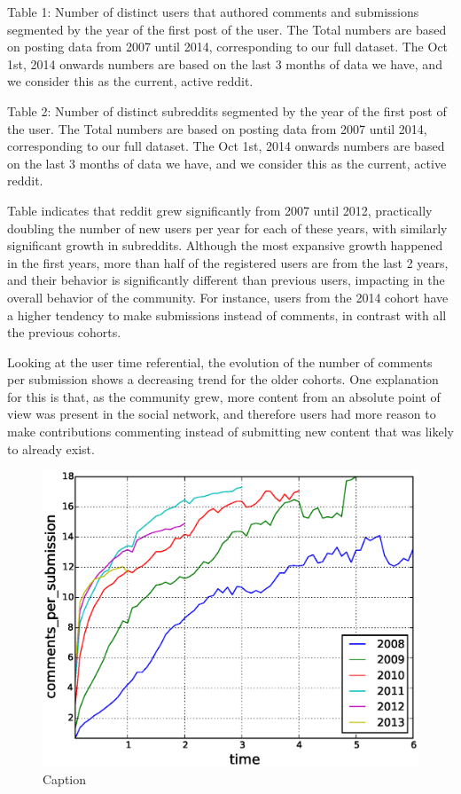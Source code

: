 Table 1: Number of distinct users that authored comments and submissions segmented by the year of the first post of the user. The Total numbers are based on posting data from 2007 until 2014, corresponding to our full dataset. The Oct 1st, 2014 onwards numbers are based on the last 3 months of data we have, and we consider this as the current, active reddit.


Table 2: Number of distinct subreddits segmented by the year of the first post of the user. The Total numbers are based on posting data from 2007 until 2014, corresponding to our full dataset. The Oct 1st, 2014 onwards numbers are based on the last 3 months of data we have, and we consider this as the current, active reddit.

Table indicates that reddit grew significantly from 2007 until 2012, practically doubling the number of new users per year for each of these years, with similarly significant growth in subreddits. Although the most expansive growth happened in the first years, more than half of the registered users are from the last 2 years, and their behavior is significantly different than previous users, impacting in the overall behavior of the community. For instance, users from the 2014 cohort have a higher tendency to make submissions instead of comments, in contrast with all the previous cohorts.


Looking at the user time referential, the evolution of the number of comments per submission shows a decreasing trend for the older cohorts. One explanation for this is that, as the community grew, more content from an absolute point of view was present in the social network, and therefore users had more reason to make contributions commenting instead of submitting new content that was likely to already exist.

\begin{figure}[!tb]
\centering
\includegraphics[scale=0.4]{./images/comments_per_submissions_cohorts.eps}
\caption{Caption}
\label{fig:comments_per_submissions_cohorts}
\end{figure}


